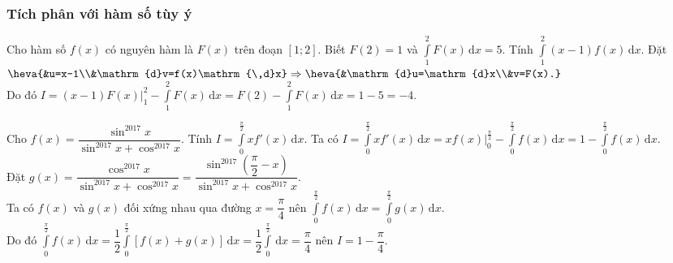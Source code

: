 \subsubsection{Tích phân với hàm số tùy ý}
\begin{ex}%
	Cho hàm số $f(x)$ có nguyên hàm là $F(x)$ trên đoạn $[1;2]$. Biết $F(2)=1$ và $\displaystyle\int\limits_{1}^{2}F(x)\mathrm{\,d}x=5$. Tính $\displaystyle\int\limits_{1}^{2}(x-1)f(x)\mathrm{\,d}x$.
	\loigiai
	{
		Đặt $\heva{&u=x-1\\&\mathrm{d}v=f(x)\mathrm{\,d}x}\Rightarrow\heva{&\mathrm{d}u=\mathrm{d}x\\&v=F(x).}$\\
		Do đó $\displaystyle I=\left.(x-1)F(x)\right|_1^2-\int\limits_1^2F(x)\mathrm{\,d}x=F(2)-\int\limits_1^2F(x)\mathrm{\,d}x=1-5=-4$.
	}
\end{ex}
\begin{ex}%
	Cho $f(x)=\dfrac{\sin^{2017}x}{\sin^{2017}x+\cos^{2017}x}$. Tính $\displaystyle I=\int\limits_0^{\frac{\pi}{2}}xf'(x)\mathrm{\,d}x$.
	\loigiai
	{
		Ta có $\displaystyle I=\int\limits_0^{\frac{\pi}{2}}xf'(x)\mathrm{\,d}x=\left.xf(x)\right|_0^{\frac{\pi}{2}}-\int\limits_0^{\frac{\pi}{2}}f(x)\mathrm{\,d}x=1-\int\limits_0^{\frac{\pi}{2}}f(x)\mathrm{\,d}x$.\\
		Đặt $g(x)=\dfrac{\cos^{2017}x}{\sin^{2017}x+\cos^{2017}x}=\dfrac{\sin^{2017}\left(\dfrac{\pi}{2}-x\right)}{\sin^{2017}x+\cos^{2017}x}$.\\
		Ta có $f(x)$ và $g(x)$ đối xứng nhau qua đường $x=\dfrac{\pi}{4}$ nên $\displaystyle\int\limits_0^{\frac{\pi}{2}}f(x)\mathrm{\,d}x=\int\limits_0^{\frac{\pi}{2}}g(x)\mathrm{\,d}x$.\\
		Do đó $\displaystyle\int\limits_0^{\frac{\pi}{2}}f(x)\mathrm{\,d}x=\dfrac{1}{2}\int\limits_0^{\frac{\pi}{2}}[f(x)+g(x)]\mathrm{\,d}x=\dfrac{1}{2}\int\limits_0^{\frac{\pi}{2}}\mathrm{\,d}x=\dfrac{\pi}{4}$ nên $I=1-\dfrac{\pi}{4}$.
	}
\end{ex}

